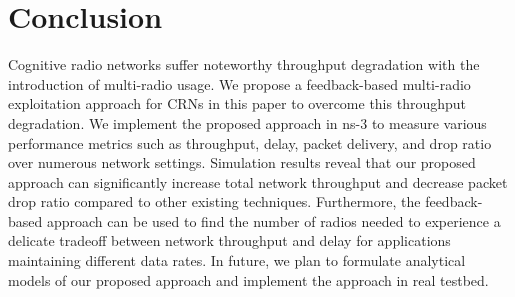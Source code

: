 \chapter{Conclusion}
Cognitive radio networks suffer noteworthy throughput degradation with the introduction of multi-radio usage. We propose a feedback-based multi-radio exploitation approach for CRNs in this paper to overcome this throughput degradation. We implement the proposed approach in ns-3 to measure various performance metrics such as throughput, delay, packet delivery, and drop ratio over numerous network settings. Simulation results reveal that our proposed approach can significantly increase total network throughput and decrease packet drop ratio compared to other existing techniques. Furthermore, the feedback-based approach can be used to find the number of radios needed to experience a delicate tradeoff between network throughput and delay for applications maintaining different data rates. In future, we plan to formulate analytical models of our proposed approach and implement the approach in real testbed.
\endinput
